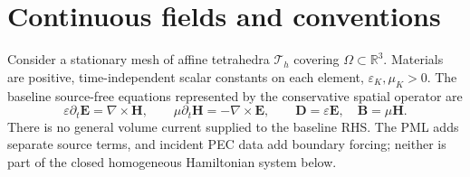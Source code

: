 \documentclass[11pt,a4paper]{article}
\newcommand{\E}{\mathbf E}
\newcommand{\HH}{\mathbf H}
\newcommand{\curl}{\nabla\times}
\newcommand{\R}{\mathbb R}
\begin{document}
\section{Continuous fields and conventions}\label{sec:continuous}
Consider a stationary mesh of affine tetrahedra \(\mathcal T_h\) covering
\(\Omega\subset\R^3\). Materials are positive, time-independent scalar
constants on each element, \(\varepsilon_K,\mu_K>0\). The baseline source-free
equations represented by the conservative spatial operator are
\begin{equation}\label{eq:maxwell}
 \varepsilon\partial_t\E=\curl\HH,\qquad
 \mu\partial_t\HH=-\curl\E,\qquad
 \mathbf D=\varepsilon\E,\quad\mathbf B=\mu\HH.
\end{equation}
There is no general volume current supplied to the baseline RHS. The PML adds
separate source terms, and incident PEC data add boundary forcing; neither is
part of the closed homogeneous Hamiltonian system below.
\end{document}
